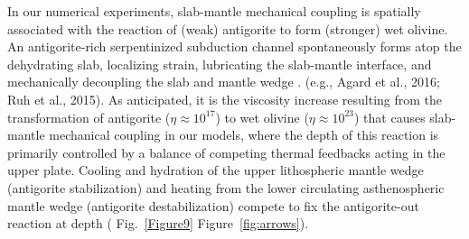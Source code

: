 \documentclass[draft,linenumbers]{agujournal2018} %
\providecommand{\DIFaddtex}[1]{{\protect\color{blue} \sf #1}} %
\providecommand{\DIFdeltex}[1]{{\protect\color{red} \scriptsize #1}} %
\providecommand{\DIFaddbegin}{} %
\providecommand{\DIFaddend}{} %
\providecommand{\DIFdelbegin}{} %
\providecommand{\DIFdelend}{} %
\providecommand{\DIFadd}[1]{\texorpdfstring{\DIFaddtex{#1}}{#1}} %
\providecommand{\DIFdel}[1]{\texorpdfstring{\DIFdeltex{#1}}{}} %
\newcommand{\DIFscaledelfig}{0.3}
\newlength{\DIFdelgraphicswidth} %
\newlength{\DIFdelgraphicsheight} %
\newcommand{\DIFaddincludegraphics}[2][]{{\color{blue}\fbox{\DIFOincludegraphics[#1]{#2}}}} %
\newcommand{\DIFdelincludegraphics}[2][]{%
\sbox{\DIFdelgraphicsbox}{\DIFOincludegraphics[#1]{#2}}%
\settoboxwidth{\DIFdelgraphicswidth}{\DIFdelgraphicsbox} %
\settoboxtotalheight{\DIFdelgraphicsheight}{\DIFdelgraphicsbox} %
\scalebox{\DIFscaledelfig}{%
\parbox[b]{\DIFdelgraphicswidth}{\usebox{\DIFdelgraphicsbox}\\[-\baselineskip] \rule{\DIFdelgraphicswidth}{0em}}\llap{\resizebox{\DIFdelgraphicswidth}{\DIFdelgraphicsheight}{%
\setlength{\unitlength}{\DIFdelgraphicswidth}%
\begin{picture}(1,1)%
\thicklines\linethickness{2pt} %
{\color[rgb]{1,0,0}\put(0,0){\framebox(1,1){}}}%
{\color[rgb]{1,0,0}\put(0,0){\line( 1,1){1}}}%
{\color[rgb]{1,0,0}\put(0,1){\line(1,-1){1}}}%
\end{picture}%
}\hspace*{3pt}}} %
} %
\DeclareRobustCommand{\DIFaddbegin}{\DIFOaddbegin \let\includegraphics\DIFaddincludegraphics} %
\DeclareRobustCommand{\DIFaddend}{\DIFOaddend \let\includegraphics\DIFOincludegraphics} %
\DeclareRobustCommand{\DIFdelbegin}{\DIFOdelbegin \let\includegraphics\DIFdelincludegraphics} %
\DeclareRobustCommand{\DIFdelend}{\DIFOaddend \let\includegraphics\DIFOincludegraphics} %
\begin{document}
\DIFaddend In our numerical experiments, slab-mantle mechanical coupling is
spatially associated with the reaction of (weak) antigorite to form
(stronger) wet olivine. An antigorite-rich serpentinized subduction
channel spontaneously forms atop the dehydrating slab, localizing
strain, lubricating the slab-mantle interface, and mechanically
decoupling the slab and mantle wedge \DIFdelbegin %
\DIFdel{.}\DIFdelend \DIFaddbegin \DIFadd{(e.g., Agard et al., 2016; Ruh et
al., 2015). }\DIFaddend As anticipated, it is the viscosity increase resulting from
the transformation of antigorite \DIFdelbegin \DIFdel{($\eta \approx 10^17$) to wet olivine ($\eta \approx 10^23$) }\DIFdelend that causes slab-mantle mechanical
coupling in our models, where the depth of this reaction is primarily
controlled by a balance of competing thermal feedbacks acting in the
upper plate. Cooling and hydration of the upper lithospheric mantle
wedge (antigorite stabilization) and heating from the lower circulating
asthenospheric mantle wedge (antigorite destabilization) compete to fix
the antigorite-out reaction at depth (\DIFdelbegin \DIFdel{Fig.~\ref{Figure9}}\DIFdelend \DIFaddbegin \DIFadd{Figure~\ref{fig:arrows}}\DIFaddend ).
\end{document}
